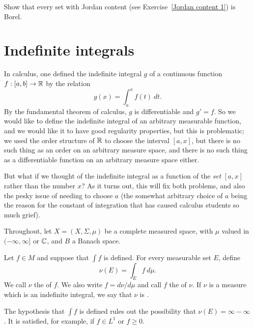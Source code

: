 \begin{exercise}
Show that every set with Jordan content (see Exercise~\ref{Jordan content 1}) is Borel.
\end{exercise}

\section{Indefinite integrals}
In calculus, one defined the indefinite integral $g$ of a continuous function $f: [a, b] \to \mathbb{R}$ by the relation
\[g(x) = \int_{a}^{x} f(t)~dt.\]
By the fundamental theorem of calculus, $g$ is differentiable and $g' = f$.
So we would like to define the indefinite integral of an arbitrary measurable function, and we would like it to have good regularity properties, but this is problematic; we used the order structure of $\mathbb{R}$ to choose the interval $[a, x]$, but there is no such thing as an order on an arbitrary measure space, and there is no such thing as a differentiable function on an arbitrary measure space either.

But what if we thought of the indefinite integral as a function of the \emph{set} $[a, x]$ rather than the number $x$?
As it turns out, this will fix both problems, and also the pesky issue of needing to choose $a$ (the somewhat arbitrary choice of $a$ being the reason for the constant of integration that has caused calculus students so much grief).

\begin{subsec}
Throughout, let $X = (X, \Sigma, \mu)$ be a complete measured space, with $\mu$ valued in $(-\infty, \infty]$ or $\mathbb{C}$, and $B$ a Banach space.
\end{subsec}

\begin{definition}
Let $f \in M$ and suppose that $\int f$ is defined. For every measurable set $E$, define
\[\nu(E) = \int_{E} f~d\mu.\]
We call $\nu$ the  of $f$.
We also write $f = d\nu/d\mu$ and call $f$ the  of $\nu$.
If $\nu$ is a measure which is an indefinite integral, we say that $\nu$ is .
\end{definition}

\begin{subsec}
The hypothesis that $\int f$ is defined rules out the possibility that $\nu(E) = \infty - \infty$.
It is satisfied, for example, if $f \in L^{1}$ or $f \geq 0$.
\end{subsec}

